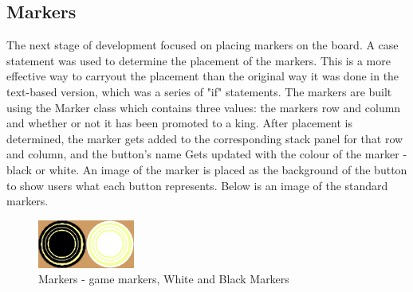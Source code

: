 \documentclass[10pt, a4paper]{article}
\begin{document}
	\subsection{Markers}
	The next stage of development focused on placing markers on the board. A case statement was used to determine the placement of the markers. This is a more effective way to carryout the placement than the original way it was done in the text-based version, which was a series of "if" statements. The markers are built using the Marker class which contains three values: the markers row and column and whether or not it has been promoted to a king. After placement is determined, the marker gets added to the corresponding stack panel for that row and column, and the button's name Gets updated with the colour of the marker - black or white. An image of the marker is placed as the background of the button to show users what each button represents. Below is an image of the standard markers.
	\begin{figure}[H]
  	\centering
  	\includegraphics[scale = 1.25]{Marker}
	\caption{Markers - game markers, White and Black Markers}
  	\label{fig:nonfloat}
	\end{figure}
	
\end{document}
